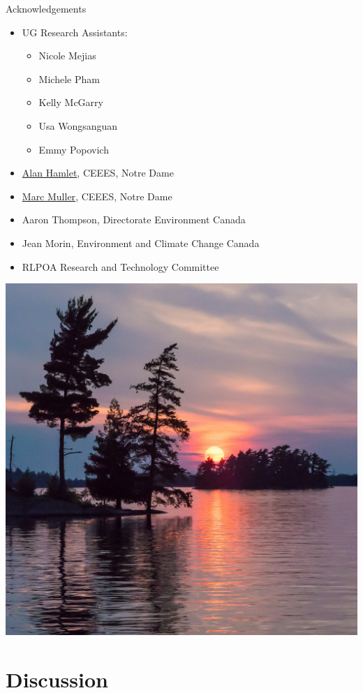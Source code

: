 \documentclass[compress,english]{beamer}
\begin{document}
\begin{frame}{Acknowledgements}
\begin{small}
\begin{itemize}
\item UG Research Assistants:
\begin{multicols}{3}
\begin{itemize}
\item Nicole Mejias
\item Michele Pham
\item Kelly McGarry
\item Usa Wongsanguan
\item Emmy Popovich
\end{itemize}
\end{multicols}
\item \href{http://engineering.nd.edu/profiles/ahamlet/}{Alan Hamlet}, CEEES, Notre Dame
\item \href{http://engineering.nd.edu/profiles/ahamlet/}{Marc Muller}, CEEES, Notre Dame
\item Aaron Thompson, Directorate Environment Canada
\item Jean Morin, Environment and Climate Change Canada
\item RLPOA Research and Technology Committee
\end{itemize}
\end{small}

\end{frame}


{\usebackgroundtemplate%
	{\includegraphics[width=\paperwidth]{FloodedSunset}}
\section{Discussion}
}

\end{document}
